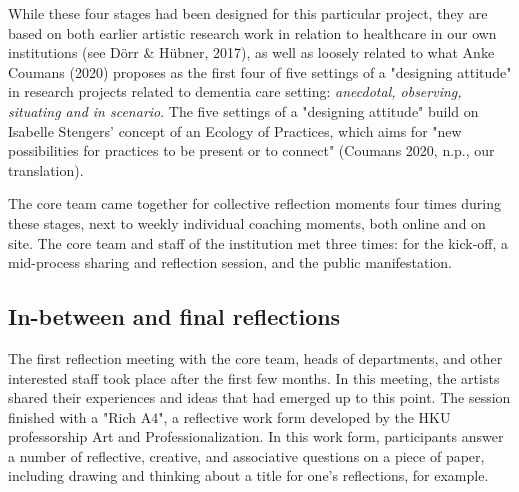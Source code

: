 \documentclass[authordate, empirical]{jote-new-article}
\begin{document}
	While these four stages had been designed for this particular project, they are based on both earlier artistic research work in relation to healthcare in our own institutions (see Dörr \& Hübner, 2017), as well as loosely related to what Anke Coumans (2020) proposes as the first four of five settings of a "designing attitude" in research projects related to dementia care setting: \emph{anecdotal, observing, situating and in scenario}. The five settings of a "designing attitude" build on Isabelle Stengers' concept of an Ecology of Practices, which aims for "new possibilities for practices to be present or to connect" (Coumans 2020, n.p., our translation).



	The core team came together for collective reflection moments four times during these stages, next to weekly individual coaching moments, both online and on site. The core team and staff of the institution met three times: for the kick-off, a mid-process sharing and reflection session, and the public manifestation.







	\subsection{In-between and final reflections}







	The first reflection meeting with the core team, heads of departments, and other interested staff took place after the first few months. In this meeting, the artists shared their experiences and ideas that had emerged up to this point. The session finished with a "Rich A4", a reflective work form developed by the HKU professorship Art and Professionalization. In this work form, participants answer a number of reflective, creative, and associative questions on a piece of paper, including drawing and thinking about a title for one's reflections, for example.
\end{document}
